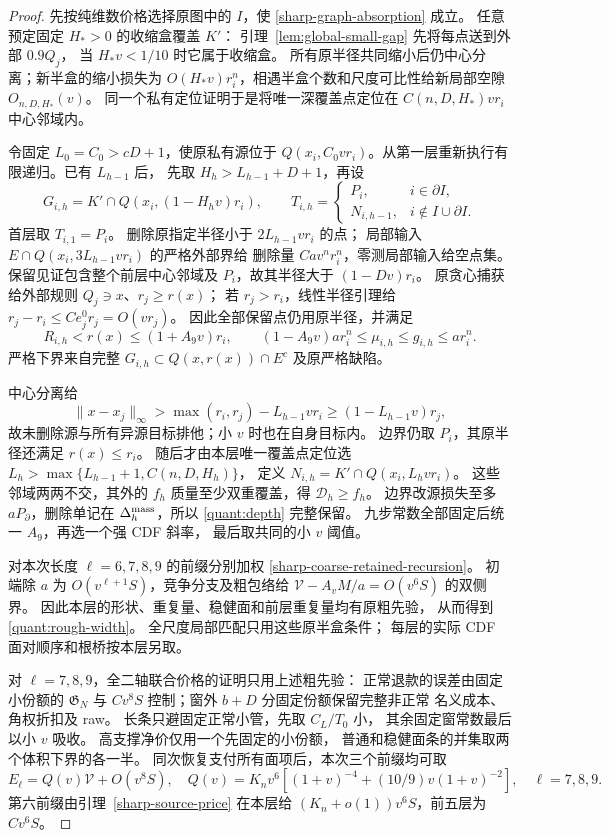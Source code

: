 \begin{proof}
先按纯维数价格选择原图中的 \(I\)，使
\eqref{sharp-graph-absorption} 成立。
任意预定固定 \(H_*>0\) 的收缩盒覆盖 \(K'\)：
引理~\ref{lem:global-small-gap} 先将每点送到外部 \(0.9Q_j\)，
当 \(H_*v<1/10\) 时它属于收缩盒。
所有原半径共同缩小后仍中心分离；新半盒的缩小损失为
\(O(H_*v)r_i^n\)，相遇半盒个数和尺度可比性给新局部空隙
\(O_{n,D,H_*}(v)\)。
同一个私有定位证明于是将唯一深覆盖点定位在
\(C(n,D,H_*)vr_i\) 中心邻域内。

令固定 \(L_0=C_0>cD+1\)，使原私有源位于
\(Q(x_i,C_0vr_i)\)。从第一层重新执行有限递归。已有 \(L_{h-1}\) 后，
先取 \(H_h>L_{h-1}+D+1\)，再设
\[
 G_{i,h}=K'\cap Q(x_i,(1-H_hv)r_i),\qquad
 T_{i,h}=
 \begin{cases}P_i,&i\in\partial I,\\
 N_{i,h-1},&i\notin I\cup\partial I.\end{cases}
\]
首层取 \(T_{i,1}=P_i\)。
删除原指定半径小于 \(2L_{h-1}vr_i\) 的点；
局部输入 \(E\cap Q(x_i,3L_{h-1}vr_i)\) 的严格外部界给
删除量 \(Ca v^nr_i^n\)，零测局部输入给空点集。
保留见证包含整个前层中心邻域及 \(P_i\)，故其半径大于
\((1-Dv)r_i\)。
原贪心捕获给外部规则 \(Q_j\ni x\)、\(r_j\ge r(x)\)；
若 \(r_j>r_i\)，线性半径引理给
\(r_j-r_i\le Ce_j^0r_j=O(vr_j)\)。
因此全部保留点仍用原半径，并满足
\[
 R_{i,h}<r(x)\le(1+A_9v)r_i,\qquad
 (1-A_9v)ar_i^n\le\mu_{i,h}\le g_{i,h}\le ar_i^n .
\]
严格下界来自完整 \(G_{i,h}\subset Q(x,r(x))\cap E^c\)
及原严格缺陷。

中心分离给
\[
 \|x-x_j\|_\infty>
 \max(r_i,r_j)-L_{h-1}vr_i\ge(1-L_{h-1}v)r_j ,
\]
故未删除源与所有异源目标排他；小 \(v\) 时也在自身目标内。
边界仍取 \(P_i\)，其原半径还满足 \(r(x)\le r_i\)。
随后才由本层唯一覆盖点定位选
\(L_h>\max\{L_{h-1}+1,C(n,D,H_h)\}\)，
定义 \(N_{i,h}=K'\cap Q(x_i,L_hvr_i)\)。
这些邻域两两不交，其外的 \(f_h\) 质量至少双重覆盖，得
\(\mathcal D_h\ge f_h\)。
边界改源损失至多 \(aP_\partial\)，删除单记在
\(\Delta_h^{\rm mass}\)，所以 \eqref{quant:depth} 完整保留。
九步常数全部固定后统一 \(A_9\)，再选一个强 CDF 斜率，
最后取共同的小 \(v\) 阈值。

对本次长度 \(\ell=6,7,8,9\) 的前缀分别加权
\eqref{sharp-coarse-retained-recursion}。
初端除 \(a\) 为 \(O(v^{\ell+1}S)\)，竞争分支及粗包络给
\(\mathcal V-A_vM/a=O(v^6S)\) 的双侧界。
因此本层的形状、重复量、稳健面和前层重复量均有原粗先验，
从而得到 \eqref{quant:rough-width}。
全尺度局部匹配只用这些原半盒条件；
每层的实际 CDF 面对顺序和根桥按本层另取。

对 \(\ell=7,8,9\)，全二轴联合价格的证明只用上述粗先验：
正常退款的误差由固定小份额的 \(\mathfrak G_N\) 与
\(Cv^8S\) 控制；窗外 \(b+D\) 分固定份额保留完整非正常
名义成本、角权折扣及 raw。
长条只避固定正常小管，先取 \(C_L/T_0\) 小，
其余固定窗常数最后以小 \(v\) 吸收。
高支撑净价仅用一个先固定的小份额，
普通和稳健面条的并集取两个体积下界的各一半。
同次恢复支付所有面项后，本次三个前缀均可取
\begin{equation}\label{quant:coarse-prefix}
 E_\ell=Q(v)\mathcal V+O(v^8S),\quad
 Q(v)=K_nv^6[(1+v)^{-4}+(10/9)v(1+v)^{-2}],
 \quad\ell=7,8,9.
\end{equation}
第六前缀由引理~\ref{sharp-source-price} 在本层给
\((K_n+o(1))v^6S\)，前五层为 \(Cv^6S\)。


\end{proof}

